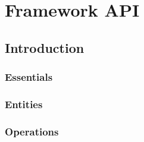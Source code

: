 \chapter{Framework API}
\section{Introduction}
\subsection{Essentials}
\subsection{Entities}
\subsection{Operations}